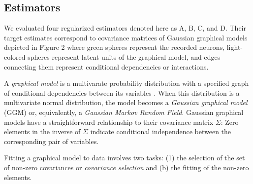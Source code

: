 \documentclass[10pt]{article}
\newcommand{\Kcomment}[1]{{\color{blue}{[KJ: #1]}}}
\begin{document}
\subsection*{Estimators}
We evaluated four regularized estimators denoted here as A, B, C, and D.  Their target estimates correspond to covariance matrices of Gaussian graphical models depicted in Figure 2 where green spheres represent the recorded neurons,  light-colored spheres represent latent units of the graphical model, and edges connecting them represent conditional dependencies or interactions.

A \emph{graphical model} is a multivarate probability distribution with a specified graph of conditional dependencies between its variables \cite{Koller:2009}.  When this distribution is a multivariate normal distribution, the model becomes a \emph{Gaussian graphical model} (GGM) or, equivalently, a \emph{Gaussian Markov Random Field}.  Gaussian graphical models have a straightforward relationship to their covariance matrix $\Sigma$:  Zero elements in the inverse of $\Sigma$ indicate conditional independence between the corresponding pair of variables.  
\Kcomment{It may be important to note that we are not fitting Gaussian graphical models, however.}


Fitting a graphical model to data involves two tasks: (1) the selection of the set of non-zero covariances or \emph{covariance selection} \cite{Dempster:1972} and (b) the fitting of the non-zero elements.
\end{document}
